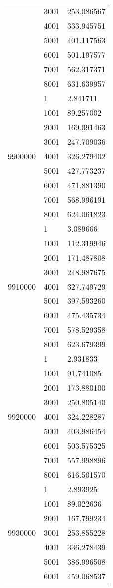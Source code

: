 \begin{table}[htb!]
\begin{tabular}{lll}
 & 3001 & 253.086567 \\
 & 4001 & 333.945751 \\
 & 5001 & 401.117563 \\
 & 6001 & 501.197577 \\
 & 7001 & 562.317371 \\
 & 8001 & 631.639957 \\
\multirow[c]{9}{*}{9900000} & 1 & 2.841711 \\
 & 1001 & 89.257002 \\
 & 2001 & 169.091463 \\
 & 3001 & 247.709036 \\
 & 4001 & 326.279402 \\
 & 5001 & 427.773237 \\
 & 6001 & 471.881390 \\
 & 7001 & 568.996191 \\
 & 8001 & 624.061823 \\
\multirow[c]{9}{*}{9910000} & 1 & 3.089666 \\
 & 1001 & 112.319946 \\
 & 2001 & 171.487808 \\
 & 3001 & 248.987675 \\
 & 4001 & 327.749729 \\
 & 5001 & 397.593260 \\
 & 6001 & 475.435734 \\
 & 7001 & 578.529358 \\
 & 8001 & 623.679399 \\
\multirow[c]{9}{*}{9920000} & 1 & 2.931833 \\
 & 1001 & 91.741085 \\
 & 2001 & 173.880100 \\
 & 3001 & 250.805140 \\
 & 4001 & 324.228287 \\
 & 5001 & 403.986454 \\
 & 6001 & 503.575325 \\
 & 7001 & 557.998896 \\
 & 8001 & 616.501570 \\
\multirow[c]{9}{*}{9930000} & 1 & 2.893925 \\
 & 1001 & 89.022636 \\
 & 2001 & 167.799234 \\
 & 3001 & 253.855228 \\
 & 4001 & 336.278439 \\
 & 5001 & 386.996508 \\
 & 6001 & 459.068537 \\

\end{tabular}
\end{table}
